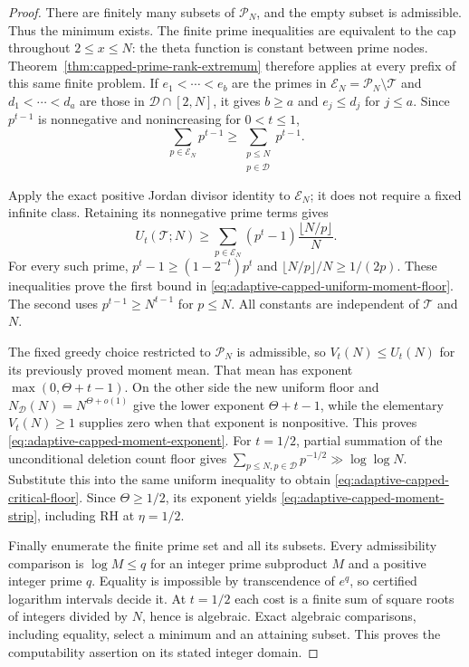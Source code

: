 \documentclass[11pt]{article}
\theoremstyle{definition}
\begin{document}
\begin{proof}
There are finitely many subsets of $\mathcal P_N$, and the empty
subset is admissible. Thus the minimum exists.
The finite prime inequalities are equivalent to the cap throughout
$2\le x\le N$: the theta function is constant between prime nodes.
Theorem~\ref{thm:capped-prime-rank-extremum} therefore applies at
every prefix of this same finite problem.
If $e_1<\cdots<e_b$ are the primes in
$\mathcal E_N=\mathcal P_N\setminus\mathcal T$ and
$d_1<\cdots<d_a$ are those in $\mathcal D\cap[2,N]$, it gives
$b\ge a$ and $e_j\le d_j$ for $j\le a$.
Since $p^{t-1}$ is nonnegative and nonincreasing for $0<t\le1$,
\[
                  \sum_{p\in\mathcal E_N}p^{t-1}
                    \ge\sum_{\substack{p\le N\\p\in\mathcal D}}p^{t-1}.
\]

Apply the exact positive Jordan divisor identity to
$\mathcal E_N$; it does not require a fixed infinite class.
Retaining its nonnegative prime terms gives
\[
 U_t(\mathcal T;N)\ge
     \sum_{p\in\mathcal E_N}(p^t-1)\frac{\lfloor N/p\rfloor}{N}.
\]
For every such prime,
$p^t-1\ge(1-2^{-t})p^t$ and
$\lfloor N/p\rfloor/N\ge1/(2p)$.
These inequalities prove the first bound in
\eqref{eq:adaptive-capped-uniform-moment-floor}.
The second uses $p^{t-1}\ge N^{t-1}$ for $p\le N$.
All constants are independent of $\mathcal T$ and $N$.

The fixed greedy choice restricted to $\mathcal P_N$ is admissible,
so $V_t(N)\le U_t(N)$ for its previously proved moment mean.
That mean has exponent $\max(0,\Theta+t-1)$.
On the other side the new uniform floor and
$N_{\mathcal D}(N)=N^{\Theta+o(1)}$ give the lower exponent
$\Theta+t-1$, while the elementary $V_t(N)\ge1$ supplies zero
when that exponent is nonpositive.
This proves \eqref{eq:adaptive-capped-moment-exponent}.
For $t=1/2$, partial summation of the unconditional deletion
count floor gives
$\sum_{p\le N,p\in\mathcal D}p^{-1/2}\gg\log\log N$.
Substitute this into the same uniform inequality to obtain
\eqref{eq:adaptive-capped-critical-floor}.
Since $\Theta\ge1/2$, its exponent yields
\eqref{eq:adaptive-capped-moment-strip}, including RH at $\eta=1/2$.

Finally enumerate the finite prime set and all its subsets.
Every admissibility comparison is $\log M\le q$ for an integer
prime subproduct $M$ and a positive integer prime $q$.
Equality is impossible by transcendence of $e^q$, so certified
logarithm intervals decide it.
At $t=1/2$ each cost is a finite sum of square roots of integers
divided by $N$, hence is algebraic.
Exact algebraic comparisons, including equality, select a minimum
and an attaining subset.
This proves the computability assertion on its stated integer domain.
\end{proof}
\end{document}
